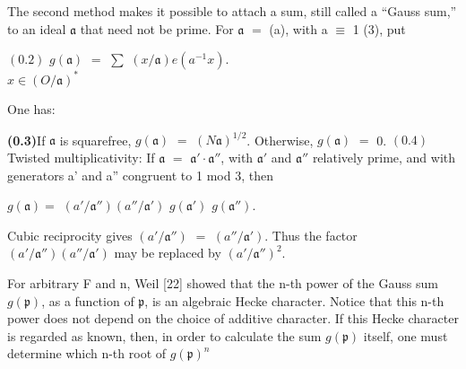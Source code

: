 \documentclass[10pt,a4paper]{article}
\begin{document}
\par The second method makes it possible to attach a sum, still called a ``Gauss sum,'' to an ideal $\mathfrak{a}$ that need not be prime. For $\mathfrak{a}$ $=$ (a), with a $\equiv{}$ 1 (3), put\par
\par\smallskip\begin{center}\begin{minipage}{0.96\textwidth}\centering
$(0.2)$ $g(\mathfrak{a})$ $=$ $\sum{}$ $(x/\mathfrak{a})e(a^{-1}x)$. \\ $x\in{}(O/\mathfrak{a})^*$
\end{minipage}\end{center}\smallskip
\par One has:\par
\par\noindent\textbf{(0.3)}\quad If $\mathfrak{a}$ is squarefree, $g(\mathfrak{a})$ $=$ $(N\mathfrak{a})^{1/2}$. Otherwise, $g(\mathfrak{a})$ $=$ 0. $(0.4)$ Twisted multiplicativity: If $\mathfrak{a}$ $=$ $\mathfrak{a}'\cdot{}\mathfrak{a}''$, with $\mathfrak{a}'$ and $\mathfrak{a}''$ relatively prime, and with generators a' and a'' congruent to 1 mod 3, then\par
\par\smallskip\begin{center}\begin{minipage}{0.96\textwidth}\centering
$g(\mathfrak{a})=$ $(a'/\mathfrak{a}'')(a''/\mathfrak{a}')$ $g(\mathfrak{a}')$ $g(\mathfrak{a}'')$.
\end{minipage}\end{center}\smallskip
\par Cubic reciprocity gives $(a'/\mathfrak{a}'')$ $=$ $(a''/\mathfrak{a}')$. Thus the factor $(a'/\mathfrak{a}'')(a''/\mathfrak{a}')$ may be replaced by $(a'/\mathfrak{a}'')^2$.\par
\par For arbitrary F and n, Weil [22] showed that the n-th power of the Gauss sum $g(\mathfrak{p})$, as a function of $\mathfrak{p}$, is an algebraic Hecke character. Notice that this n-th power does not depend on the choice of additive character. If this Hecke character is regarded as known, then, in order to calculate the sum $g(\mathfrak{p})$ itself, one must determine which n-th root of $g(\mathfrak{p})^n$\par
\end{document}
